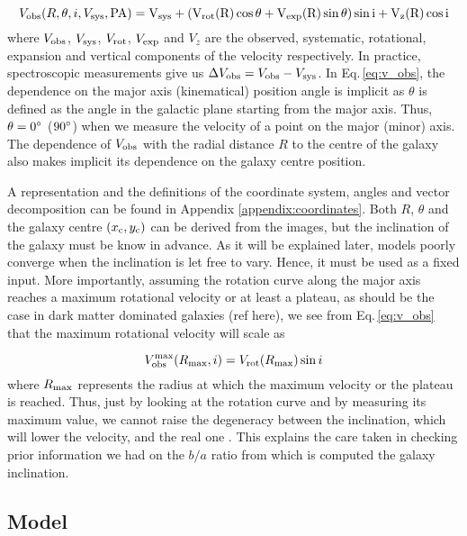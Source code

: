 \begin{equation}
	V_{\rm{obs}} ( R, \theta , i, V_{\rm{sys}} , \rm{PA} ) = V_{\rm{sys}} + \left ( V_{\rm{rot}} (R) \cos \theta + V_{\rm{exp}} (R) \sin \theta \right ) \sin i + V_z (R) \cos i
	\label{eq:v_obs}
\end{equation}
where $V_{\rm{obs}}$, $V_{\rm{sys}}$, $V_{\rm{rot}}$, $V_{\rm{exp}}$ and $V_z$ are the observed,  systematic, rotational, expansion and vertical components of the velocity respectively. In practice, spectroscopic measurements give us $\Delta V_{\rm{obs}} = V_{\rm{obs}} - V_{\rm{sys}}$. In Eq.\,\ref{eq:v_obs}, the dependence on the major axis (kinematical) position angle is implicit as $\theta$ is defined as the angle in the galactic plane starting from the major axis. Thus, $\theta = 0 \degree$ ($90 \degree$) when we measure the velocity of a point on the major (minor) axis. The dependence of $V_{\rm{obs}}$ with the radial distance $R$ to the centre of the galaxy also makes implicit its dependence on the galaxy centre position.

A representation and the definitions of the coordinate system, angles and vector decomposition can be found in Appendix \ref{appendix:coordinates}. Both $R$, $\theta$ and the galaxy centre $(x_{\rm{c}} , y_{\rm{c}})$ can be derived from the images, but the inclination of the galaxy must be know in advance. As it will be explained later, models poorly converge when the inclination is let free to vary. Hence, it must be used as a fixed input. More importantly, assuming the rotation curve along the major axis reaches a maximum rotational velocity or at least a plateau, as should be the case in dark matter dominated galaxies (ref here), we see from Eq.\,\ref{eq:v_obs} that the maximum rotational velocity will scale as

\begin{equation}
	V_{\rm{obs}}^{\rm{max}} (R_{\rm{max}}, i) = V_{\rm{rot}} (R_{\rm{max}}) \sin i
\end{equation}
where $R_{\rm{max}}$ represents the radius at which the maximum velocity or the plateau is reached. Thus, just by looking at the rotation curve and by measuring its maximum value, we cannot raise the degeneracy between the inclination, which will lower the velocity, and the real one . This explains the care taken in checking prior information we had on the $b/a$ ratio from which is computed the galaxy inclination.


\subsection{Model}
\label{subsec:model}

